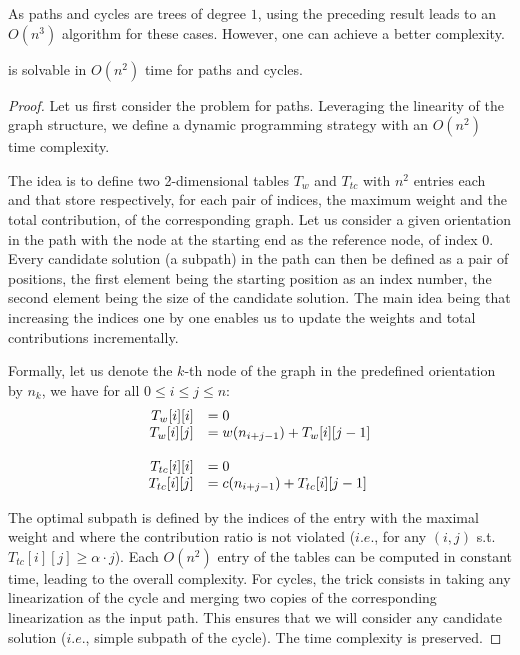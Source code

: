 		As paths and cycles are trees of degree $1$, using the preceding result leads to an $O(n^3)$ algorithm for these cases. However, one can achieve a better complexity.

		\begin{proposition}
		  \rbmwcs{} is solvable in $O(n^2)$ time for paths and cycles.
		\end{proposition}
		\begin{proof}
			Let us first consider the \rbmwcs{} problem for paths. Leveraging the linearity of the graph structure, we define a dynamic programming strategy with an $O(n^2)$ time complexity.

			The idea is to define two 2-dimensional tables $T_w$ and $T_{tc}$ with $n^2$ entries each and that store respectively, for each pair of indices, the maximum weight and the total contribution, of the corresponding graph. Let us consider a given orientation in the path with the node at the starting end as the reference node, of index 0. Every candidate solution (a subpath) in the path can then be defined as a pair of positions, the first element being the starting position as an index number, the second element being the size of the candidate solution. The main idea being that increasing the indices one by one enables us to update the weights and total contributions incrementally.

			Formally, let us denote the $k$-th node of the graph in the predefined orientation by $n_k$, we have for all $0 \leq i \leq j \leq n$: 
			\[
			  \begin{array}{rl}
				T_w[i][i]    &= 0 \\
				 T_w[i][j]    &= w(n_{i+j-1}) + T_w[i][j-1] \\
				 \vphantom{foobar} \\
				 T_{tc}[i][i] &= 0 \\
				 T_{tc}[i][j] &= c(n_{i+j-1}) + T_{tc}[i][j-1]
			  \end{array}
			\]

			The optimal subpath is defined by the indices of the entry with the maximal weight and where the contribution ratio is not violated ($i.e.$, for any $(i,j)$ s.t. $T_{tc}[i][j]\geq \alpha \cdot j$).
			Each $O(n^2)$ entry of the tables can be computed in constant time, leading to the overall complexity.
			For cycles, the trick consists in taking any linearization of the cycle and merging two copies of the corresponding linearization as the input path.
			This ensures that we will consider any candidate solution ($i.e.$, simple subpath of the cycle).
			The time complexity is preserved.
		\end{proof}


